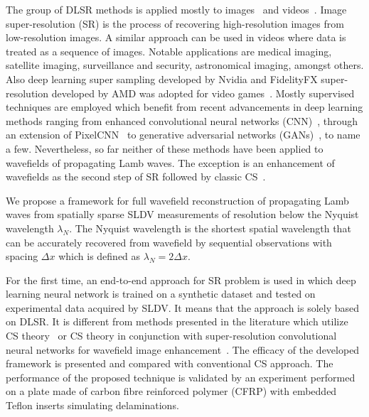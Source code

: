 The group of DLSR methods is applied mostly to images~\cite{Dahl2017,Zhang2018,Wang2019} and videos~\cite{Zhang2017,Yan2019}.
Image super-resolution (SR) is the process of recovering high-resolution images from low-resolution images.
A similar approach can be used in videos where data is treated as a sequence of images.
Notable applications are medical imaging, satellite imaging, surveillance and security, astronomical imaging, amongst others.
Also deep learning super sampling developed by Nvidia and FidelityFX super-resolution developed by AMD was adopted for video games~\cite{Claypool2006}.
Mostly supervised techniques are employed
which benefit from recent advancements in deep learning methods ranging from enhanced convolutional neural networks (CNN)~\cite{Zhang2017}, through an extension of PixelCNN~\cite{Dahl2017} to generative adversarial networks (GANs)~\cite{Wang2019}, to name a few.
Nevertheless, so far neither of these methods have been applied to wavefields of propagating Lamb waves.
The exception is an enhancement of wavefields as the second step of SR followed by classic CS~\cite{Park2017a,KeshmiriEsfandabadi2020}.

We propose a framework for full wavefield reconstruction of propagating Lamb waves from spatially sparse SLDV measurements of resolution below the Nyquist wavelength $\lambda_N$. 
The Nyquist wavelength is the shortest spatial wavelength that can be accurately recovered from wavefield by sequential observations with spacing $\Delta x$ which is defined as $\lambda_N = 2 \Delta x$. 

For the first time, an end-to-end approach for SR problem is used in which deep learning neural network is trained on a synthetic dataset and tested on experimental data acquired by SLDV.
It means that the approach is solely based on DLSR.
It is different from methods presented in the literature which utilize CS theory~\cite{Harley2013,KeshmiriEsfandabadi2018} or CS theory in conjunction with super-resolution convolutional neural networks for wavefield image enhancement~\cite{Park2017a,KeshmiriEsfandabadi2020}.
The efficacy of the developed framework is presented and compared with conventional CS approach.  
The performance of the proposed technique is validated by an experiment performed on a plate made of carbon fibre reinforced polymer (CFRP) with embedded Teflon inserts simulating delaminations.

